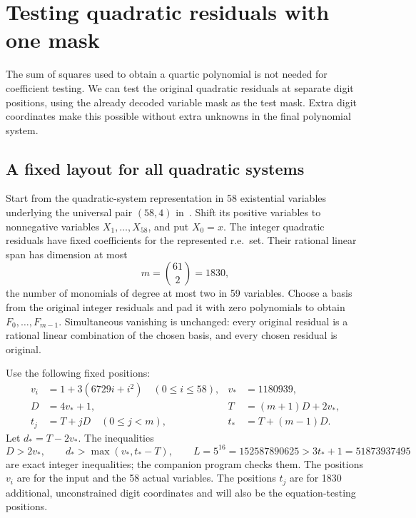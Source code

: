 \section{Testing quadratic residuals with one mask}\label{sec:quadratic-masks}

The sum of squares used to obtain a quartic polynomial is not needed for
coefficient testing. We can test the original quadratic residuals at
separate digit positions, using the already decoded variable mask as the
test mask. Extra digit coordinates make this possible without extra
unknowns in the final polynomial system.

\subsection{A fixed layout for all quadratic systems}

Start from the quadratic-system representation in 58 existential
variables underlying the universal pair $(58,4)$ in~\cite[\S5]{J82}.
Shift its positive variables to nonnegative variables
$X_1,\ldots,X_{58}$, and put $X_0=x$. The integer quadratic residuals
have fixed coefficients for the represented r.e.\ set. Their rational
linear span has dimension at most
\[
 m=\binom{61}{2}=1830,
\]
the number of monomials of degree at most two in 59 variables.
Choose a basis from the original integer residuals and pad it with zero
polynomials to obtain $F_0,\ldots,F_{m-1}$. Simultaneous vanishing is
unchanged: every original residual is a rational linear combination of
the chosen basis, and every chosen residual is original.

Use the following fixed positions:
\begin{align*}
 v_i&=1+3(6729i+i^2)\quad(0\le i\le58),& v_*&=1180939,\\
 D&=4v_*+1,& T&=(m+1)D+2v_*,\\
 t_j&=T+jD\quad(0\le j<m),& t_*&=T+(m-1)D.
\end{align*}
Let $d_*=T-2v_*$. The inequalities
\begin{equation}\label{eq:quad-layout-bounds}
 D>2v_*,\qquad
 d_*>\max(v_*,t_*-T),\qquad
 L=5^{16}=152587890625>3t_*+1=51873937495
\end{equation}
are exact integer inequalities; the companion program checks them.
The positions $v_i$ are for the input and the 58 actual variables.
The positions $t_j$ are for 1830 additional, unconstrained digit
coordinates and will also be the equation-testing positions.

